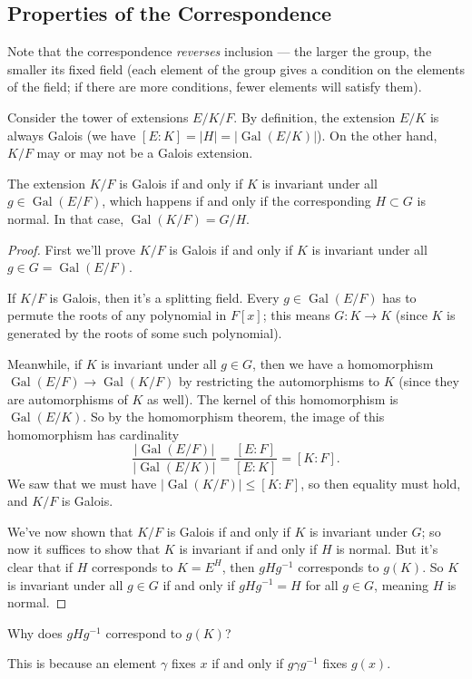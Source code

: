 \subsection{Properties of the Correspondence}

Note that the correspondence \emph{reverses} inclusion --- the larger the group, the smaller its fixed field (each element of the group gives a condition on the elements of the field; if there are more conditions, fewer elements will satisfy them). 

Consider the tower of extensions $E/K/F$. By definition, the extension $E/K$ is always Galois (we have $[E : K] = \lvert H \rvert = \lvert \operatorname{Gal}(E/K)\rvert$). On the other hand, $K/F$ may or may not be a Galois extension. 

\begin{proposition}
    The extension $K/F$ is Galois if and only if $K$ is invariant under all $g \in \operatorname{Gal}(E/F)$, which happens if and only if the corresponding $H \subset G$ is normal. In that case, $\operatorname{Gal}(K/F) = G/H$. 
\end{proposition}

\begin{proof}
    First we'll prove $K/F$ is Galois if and only if $K$ is invariant under all $g \in G = \operatorname{Gal}(E/F)$. 
    
    If $K/F$ is Galois, then it's a splitting field. Every $g \in \operatorname{Gal}(E/F)$ has to permute the roots of any polynomial in $F[x]$; this means $G : K \to K$ (since $K$ is generated by the roots of some such polynomial). 

    Meanwhile, if $K$ is invariant under all $g \in G$, then we have a homomorphism $\operatorname{Gal}(E/F) \to \operatorname{Gal}(K/F)$ by restricting the automorphisms to $K$ (since they are automorphisms of $K$ as well). The kernel of this homomorphism is $\operatorname{Gal}(E/K)$. So by the homomorphism theorem, the image of this homomorphism has cardinality \[\frac{\lvert\operatorname{Gal}(E/F)\rvert}{\lvert\operatorname{Gal}(E/K)\rvert} = \frac{[E : F]}{[E : K]} = [K : F].\] We saw that we must have $\lvert \operatorname{Gal}(K/F)\rvert \leq [K : F]$, so then equality must hold, and $K/F$ is Galois. 
    
    We've now shown that $K/F$ is Galois if and only if $K$ is invariant under $G$; so now it suffices to show that $K$ is invariant if and only if $H$ is normal. But it's clear that if $H$ corresponds to $K = E^H$, then $gHg^{-1}$ corresponds to $g(K)$. So $K$ is invariant under all $g \in G$ if and only if $gHg^{-1} = H$ for all $g \in G$, meaning $H$ is normal. 
\end{proof}

\begin{question}
Why does $gHg^{-1}$ correspond to $g(K)$?
\end{question}

\begin{ans}
This is because an element $\gamma$ fixes $x$ if and only if $g\gamma g^{-1}$ fixes $g(x)$. 
\end{ans}

